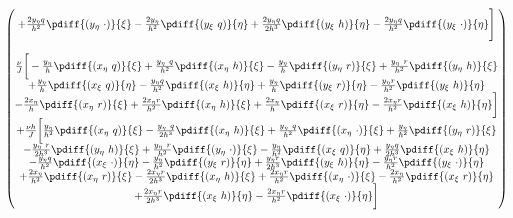 \begin{align}
\begin{pmatrix}
		+ \frac{2 y_{\eta} q }{h^2}  \pdiff{ (y_{\eta}\ \cdot)}{\xi}
		- \frac{2 y_{\eta}}{h^2}  \pdiff{(y_{\xi}\ q)}{\eta}
		+ \frac{2 y_{\eta} q}{2h^3} \pdiff{(y_{\xi}\ h)}{\eta}
		- \frac{2 y_{\eta} q}{h^2} \pdiff{(y_{\xi}\ \cdot)}{\eta}\Bigg]
		\\
		\\
		\frac{\nu}{J} \bigg[
		- \frac{y_{\eta}}{h} \pdiff{(x_{\eta}\ q)}{\xi}
		+ \frac{y_{\eta}\ q }{h^2} \pdiff{(x_{\eta}\ h)}{\xi}
		- \frac{y_{\eta}}{h} \pdiff{(y_{\eta}\ r)}{\xi}
		+ \frac{y_{\eta}\ r }{h^2} \pdiff{(y_{\eta}\ h)}{\xi}\\
		+ \frac{y_{\eta}}{h}   \pdiff{(x_{\xi}\ q)}{\eta}
		- \frac{y_{\eta}q}{h^2}   \pdiff{(x_{\xi}\ h)}{\eta}
		+ \frac{y_{\eta}}{h} \pdiff{(y_{\xi}\ r)}{\eta}
		- \frac{y_{\eta}r}{h^2} \pdiff{(y_{\xi}\ h)}{\eta}\\
		- \frac{2 x_{\eta}}{h} \pdiff{(x_{\eta}\ r)}{\xi}
		+ \frac{2 x_{\eta}r}{h^2} \pdiff{(x_{\eta}\  h)}{\xi}
		+ \frac{2 x_{\eta}}{h}  \pdiff{(x_{\xi}\ r)}{\eta}
		- \frac{2 x_{\eta}r}{h^2}  \pdiff{(x_{\xi}\ h)}{\eta}\bigg]\\
		+ \frac{\nu h}{J} \bigg[
		\frac{y_{\eta}}{h^2} \pdiff{(x_{\eta}\ q)}{\xi}
		- \frac{y_{\eta}\ q }{2h^3} \pdiff{(x_{\eta}\ h)}{\xi}
		+ \frac{y_{\eta}\ q }{h^2} \pdiff{(x_{\eta}\ \cdot)}{\xi}
		+ \frac{y_{\eta}}{h^2} \pdiff{(y_{\eta}\ r)}{\xi}\\
		- \frac{y_{\eta}\ r }{2h^3} \pdiff{(y_{\eta}\ h)}{\xi}
		+ \frac{y_{\eta}\ r }{h^2} \pdiff{(y_{\eta}\ \cdot)}{\xi}
		- \frac{y_{\eta}}{h^2}   \pdiff{(x_{\xi}\ q)}{\eta}
		+ \frac{y_{\eta}q}{2h^3}   \pdiff{(x_{\xi}\ h)}{\eta}\\
		- \frac{y_{\eta}q}{h^2}   \pdiff{(x_{\xi}\ \cdot)}{\eta}
		- \frac{y_{\eta}}{h^2} \pdiff{(y_{\xi}\ r)}{\eta}
		+ \frac{y_{\eta}r}{2h^3} \pdiff{(y_{\xi}\ h)}{\eta}
		- \frac{y_{\eta}r}{h^2} \pdiff{(y_{\xi}\ \cdot)}{\eta}\\
		+ \frac{2 x_{\eta}}{h^2} \pdiff{(x_{\eta}\ r)}{\xi}
		- \frac{2 x_{\eta}r}{2h^3} \pdiff{(x_{\eta}\  h)}{\xi}
		+ \frac{2 x_{\eta}r}{h^2} \pdiff{(x_{\eta}\  \cdot)}{\xi}
		- \frac{2 x_{\eta}}{h^2}  \pdiff{(x_{\xi}\ r)}{\eta}\\
		+ \frac{2 x_{\eta}r}{2h^3}  \pdiff{(x_{\xi}\ h)}{\eta}
		- \frac{2 x_{\eta}r}{h^2}  \pdiff{(x_{\xi}\ \cdot)}{\eta}\bigg]
\end{pmatrix}
\end{align}
%
